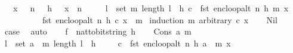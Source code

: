 \begin{isabellebody}
\ \ \ {\isachardoublequoteopen}x\ {\isachargreater}{\kern0pt}\ {}{\isachardoublequoteclose}\ {\isachardoublequoteopen}n\ {\isachargreater}{\kern0pt}\ {}{\isachardoublequoteclose}\ {\isachardoublequoteopen}h\ {\isachargreater}{\kern0pt}\ {}{\isachardoublequoteclose}\ {\isachardoublequoteopen}x\ {\isacharless}{\kern0pt}\ n{\isachardoublequoteclose}\ \isanewline
\ \ \ \ {\isachardoublequoteopen}{\isasymlbrakk}{\isasymforall}l\ {\isasymin}\ set\ m{\isachardot}{\kern0pt}\ length\ l\ {\isasymle}\ h{\isacharsemicolon}{\kern0pt}\ c\ {\isacharequal}{\kern0pt}\ fst\ {\isacharparenleft}{\kern0pt}enc{\isacharunderscore}{\kern0pt}loop{\isacharunderscore}{\kern0pt}alt\ {\isacharparenleft}{\kern0pt}n{\isacharcomma}{\kern0pt}\ h{\isacharcomma}{\kern0pt}\ m{\isacharparenright}{\kern0pt}\ x{\isacharparenright}{\kern0pt}{\isasymrbrakk}\ {\isasymLongrightarrow}\ \isanewline
\ \ \ \ \ \ \ \ \ \ fst\ {\isacharparenleft}{\kern0pt}enc{\isacharunderscore}{\kern0pt}loop{\isacharunderscore}{\kern0pt}alt\ {\isacharparenleft}{\kern0pt}n{\isacharcomma}{\kern0pt}\ h{\isacharcomma}{\kern0pt}\ c{\isacharparenright}{\kern0pt}\ x{\isacharparenright}{\kern0pt}\ {\isacharequal}{\kern0pt}\ m{\isachardoublequoteclose}\isanewline
%
\isadelimproof
\isanewline
%
\endisadelimproof
%
\isatagproof
{}\isamarkupfalse%
\ {\isacharparenleft}{\kern0pt}induction\ m\ arbitrary{\isacharcolon}{\kern0pt}\ c\ x{\isacharparenright}{\kern0pt}\isanewline
\ \ \isamarkupfalse%
\ Nil\isanewline
\ \ \isamarkupfalse%
\ \isamarkupfalse%
\ {\isacharquery}{\kern0pt}case\ \isamarkupfalse%
\ auto\isanewline
{}\isamarkupfalse%
\isanewline
\ \ \isamarkupfalse%
\ {\isacharquery}{\kern0pt}f\ {\isacharequal}{\kern0pt}\ {\isachardoublequoteopen}nat{\isacharunderscore}{\kern0pt}to{\isacharunderscore}{\kern0pt}bitstring\ h{\isachardoublequoteclose}\isanewline
\ \ \isamarkupfalse%
\ {\isacharparenleft}{\kern0pt}Cons\ a\ m{\isacharparenright}{\kern0pt}\isanewline
\ \ \isamarkupfalse%
\ {\isachardoublequoteopen}{\isasymforall}l\ {\isasymin}\ set\ {\isacharparenleft}{\kern0pt}a\ {\isacharhash}{\kern0pt}\ m{\isacharparenright}{\kern0pt}{\isachardot}{\kern0pt}\ length\ l\ {\isasymle}\ h{\isachardoublequoteclose}\ \isanewline
\ \ \isamarkupfalse%
\ {\isachardoublequoteopen}c\ {\isacharequal}{\kern0pt}\ fst\ {\isacharparenleft}{\kern0pt}enc{\isacharunderscore}{\kern0pt}loop{\isacharunderscore}{\kern0pt}alt\ {\isacharparenleft}{\kern0pt}n{\isacharcomma}{\kern0pt}\ h{\isacharcomma}{\kern0pt}\ a\ {\isacharhash}{\kern0pt}\ m{\isacharparenright}{\kern0pt}\ x{\isacharparenright}{\kern0pt}{\isachardoublequoteclose}\isanewline

\end{isabellebody}
